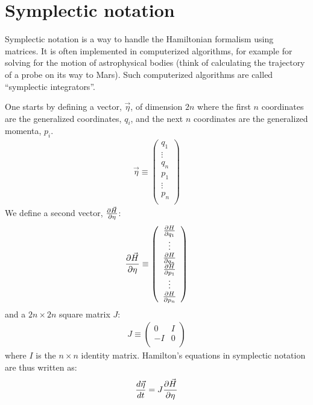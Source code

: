 \section{Symplectic notation}
Symplectic notation is a way to handle the Hamiltonian formalism using matrices. It is often implemented in computerized algorithms, for example for solving for the motion of astrophysical bodies (think of calculating the trajectory of a probe on its way to Mars). Such computerized algorithms are called ``symplectic integrators''.

One starts by defining a vector, $\vec\eta$, of dimension $2n$ where the first $n$ coordinates are the generalized coordinates, $q_i$, and the next $n$ coordinates are the generalized momenta, $p_i$.
\begin{align}
\vec\eta\equiv\left(\begin{array}{c}
 q_1 \\ \vdots \\  q_n \\ p_1 \\ \vdots \\ p_n \\
\end{array} \right)
\end{align}
We define a second vector, $\frac{\partial \vec H}{\partial \eta}$:
\begin{align}
\frac{\partial \vec H}{\partial \eta}\equiv\left(\begin{array}{c}
 \frac{\partial H}{\partial q_1} \\ \vdots \\ \frac{\partial H}{\partial q_n} \\ \frac{\partial H}{\partial p_1} \\ \vdots \\ \frac{\partial H}{\partial p_n} \\
\end{array} \right)
\end{align}
and a $2n\times 2n$ square matrix $J$:
\begin{align}
J\equiv\left(\begin{array}{cc}
 0 &I \\  -I &0 \\
\end{array} \right)
\end{align}
where $I$ is the $n\times n$ identity matrix. Hamilton's equations in symplectic notation are thus written as:
\begin{align}
\frac{d\vec\eta}{dt}=J\frac{\partial \vec H}{\partial \eta}
\end{align}

